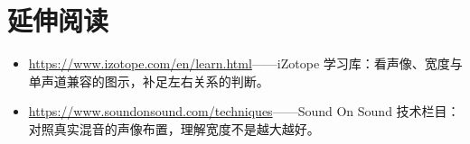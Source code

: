 \section*{延伸阅读}
\begin{itemize}[leftmargin=1.5em]
\item \url{https://www.izotope.com/en/learn.html}——iZotope 学习库：看声像、宽度与单声道兼容的图示，补足左右关系的判断。
\item \url{https://www.soundonsound.com/techniques}——Sound On Sound 技术栏目：对照真实混音的声像布置，理解宽度不是越大越好。
\end{itemize}
